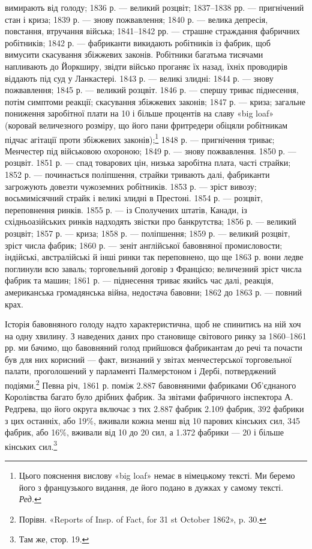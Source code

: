 \parcont{}  %
вимирають від голоду; 1836 р. — великий розцвіт; 1837--1838 рр. —
пригнічений стан і криза; 1839 р. — знову пожвавлення; 1840 р. —
велика депресія, повстання, втручання війська; 1841--1842 рр. —
страшне страждання фабричних робітників; 1842 р. — фабриканти
викидають робітників із фабрик, щоб вимусити скасування збіжжевих
законів. Робітники багатьма тисячами напливають до
Йоркширу, звідти військо проганяє їх назад, їхніх проводирів
віддають під суд у Ланкастері. 1843 р. — великі злидні: 1844 р. —
знову пожвавлення; 1845 р. — великий розцвіт. 1846 р. — спершу
триває піднесення, потім симптоми реакції; скасування збіжжевих
законів; 1847 р. — криза; загальне пониження заробітної плати
на 10 і більше процентів на славу «big loaf» (коровай величезного
розміру, що його пани фритредери обіцяли робітникам підчас
агітації проти збіжжевих законів);\footnote*{
Цього пояснення вислову «big loaf» немає в німецькому тексті.
Ми беремо його з французького видання, де його подано в дужках у самому
тексті. \emph{Ред.}
} 1848 р. — пригнічення триває; Менчестер під військовою охороною; 1849 р. —
знову пожвавлення. 1850 р. — розцвіт. 1851 р. — спад товарових цін, низька
заробітна плата, часті страйки; 1852 р. — починається поліпшення,
страйки тривають далі, фабриканти загрожують довезти чужоземних
робітників. 1853 р. — зріст вивозу; восьмимісячний страйк
і великі злидні в Престоні. 1854 р. — розцвіт, переповнення ринків.
1855 р. — із Сполучених штатів, Канади, із східньоазійських
ринків надходять звістки про банкрутства; 1856 р. — великий
розцвіт; 1857 р. — криза; 1858 р. — поліпшення; 1859 р. — великий
розцвіт, зріст числа фабрик; 1860 р. — зеніт англійської
бавовняної промисловости; індійські, австралійські й інші ринки
так переповнено, що ще 1863 р. вони ледве поглинули всю заваль;
торговельний договір з Францією; величезний зріст числа фабрик
та машин; 1861 р. — піднесення триває якийсь час далі, реакція,
американська громадянська війна, недостача бавовни; 1862 до
1863 р. — повний крах.

Історія бавовняного голоду надто характеристична, щоб не
спинитись на ній хоч на одну хвилину. З наведених даних про
становище світового ринку за 1860--1861 рр. ми бачимо, що
бавовняний голод прийшовся фабрикантам до речі та почасти був
для них корисний — факт, визнаний у звітах менчестерської
торговельної палати, проголошений у парламенті Палмерстоном
і Дербі, потверджений подіями.\footnote{
Порівн. «Reports of Insp. of Fact, for 31 st October 1862», p. 30.
} Певна річ, 1861 р.
поміж \num{2.887} бавовняними фабриками Об’єднаного Королівства
багато було дрібних фабрик. За звітами фабричного інспектора
А. Редґрева, що його округа включає з тих \num{2.887} фабрик \num{2.109} фабрик,
392 фабрики з цих останніх, або 19\%, вживали кожна
менш від 10 парових кінських сил, 345 фабрик, або 16\%, вживали
від 10 до 20 сил, а \num{1.372} фабрики — 20 і більше кінських сил.\footnote{
Там же, стор. 19.
}
\parbreak{}  %
